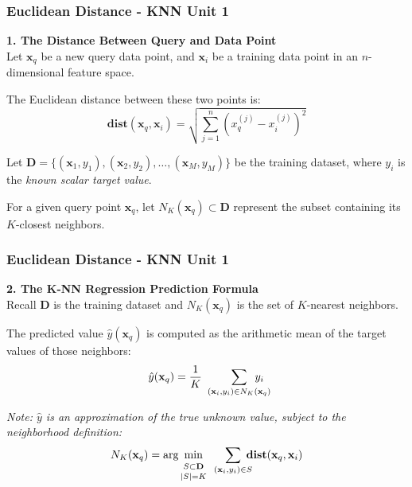\documentclass[12pt]{beamer}
\newcommand{\FrameTitle}[2]{\frametitle{#1 \hfill \small\textnormal{\textcolor{midgray}{#2}}}}
\newcommand{\vsp}{\vspace*{1em}}
\newcommand{\SixPtVspace}{\vspace*{6pt}}
\newcommand{\MVec}[1]{\mathbf{#1}}
\begin{document}
\begin{frame}\FrameTitle{Euclidean Distance - KNN}{Unit 1}
    \noindent\textbf{1. The Distance Between Query and Data Point}\vsp\\

    Let $\MVec{x}_q$ be a new query data point, and $\MVec{x}_i$ be a
    training data point in an $n$-dimensional feature space.

    \SixPtVspace
    The Euclidean distance between these two points is:
    \vspace*{3pt}
    \begin{equation*}
        \mathbf{dist}(\MVec{x}_q, \MVec{x}_i) = \sqrt{\sum_{j=1}^{n} (x_q^{(j)} - x_i^{(j)})^2}
    \end{equation*}

    \vsp
    Let $\mathbf{D} = \{(\MVec{x}_1, y_1), (\MVec{x}_2, y_2), \dots, (\MVec{x}_M, y_M)\}$
    be the training dataset, where $y_i$ is the \emph{known scalar target value}.

    \vsp
    For a given query point $\MVec{x}_q$, let $N_K(\MVec{x}_q) \subset \mathbf{D}$
    represent the subset containing its $K$-closest neighbors.

    \vfill
\end{frame}

\begin{frame}\FrameTitle{Euclidean Distance - KNN}{Unit 1}
    \noindent\textbf{2. The K-NN Regression Prediction Formula} \vsp\\
    Recall $\mathbf{D}$ is the training dataset and $N_K(\MVec{x}_q)$ is the set of $K$-nearest neighbors.

    \vsp
    The predicted value $\hat{y}(\MVec{x}_q)$ is computed as the
    arithmetic mean of the target values of those neighbors:
    \begin{equation*}
        \hat{y}(\MVec{x}_q) = \frac{1}{K} \ \sum_{(\MVec{x}_i, y_i) \in N_K(\MVec{x}_q)} \hspace*{-1.6em}y_i
    \end{equation*}

    \vsp
    \textit{Note: $\hat{y}$ is an approximation of the true unknown value, subject to the neighborhood definition:}
    \begin{equation*}
        N_K(\MVec{x}_q) = \arg\min_{\substack{\vspace*{2pt}\\S \subset \mathbf{D} \vspace*{2pt}\\ |S| = K}} \ \, \sum_{(\MVec{x}_i, y_i) \in S} \hspace*{-0.7em} \mathbf{dist}(\MVec{x}_q, \MVec{x}_i)
    \end{equation*}
    \vfill
\end{frame}
\end{document}
